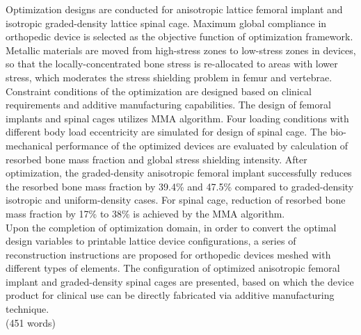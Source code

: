 \documentclass[12pt]{extbook}
\begin{document}
Optimization designs are conducted for anisotropic lattice femoral implant and isotropic graded-density lattice spinal cage. Maximum global compliance in orthopedic device is selected as the objective function of optimization framework. Metallic materials are moved from high-stress zones to low-stress zones in devices, so that the locally-concentrated bone stress is re-allocated to areas with lower stress, which moderates the stress shielding problem in femur and vertebrae. Constraint conditions of the optimization are designed based on clinical requirements and additive manufacturing capabilities. The design of femoral implants and spinal cages utilizes MMA algorithm. Four loading conditions with different body load eccentricity are simulated for design of spinal cage. The bio-mechanical performance of the optimized devices are evaluated by calculation of resorbed bone mass fraction and global stress shielding intensity. After optimization, the graded-density anisotropic femoral implant successfully reduces the resorbed bone mass fraction by 39.4\% and 47.5\% compared to graded-density isotropic and uniform-density cases. For spinal cage, reduction of resorbed bone mass fraction by 17\% to 38\% is achieved by the MMA algorithm.\\

Upon the completion of optimization domain, in order to convert the optimal design variables to printable lattice device configurations, a series of reconstruction instructions are proposed for orthopedic devices meshed with different types of elements. The configuration of optimized anisotropic femoral implant and graded-density spinal cages are presented, based on which the device product for clinical use can be directly fabricated via additive manufacturing technique.\\

(451 words)\\
\newpage
\thispagestyle{empty}
~\\
\newpage
\thispagestyle{empty}
\centering
\end{document}
